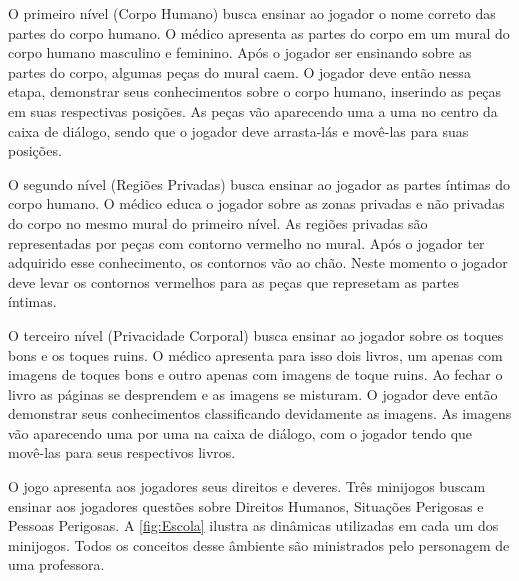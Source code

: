 \begin{figure}
  \vspace{-1.0cm}
\end{figure}

O primeiro nível (Corpo Humano) busca ensinar ao jogador o nome correto das partes do corpo humano. O médico apresenta as partes do corpo em um mural do corpo humano masculino e feminino. Após o jogador ser ensinando sobre as partes do corpo, algumas peças do mural caem. O jogador deve então nessa etapa, demonstrar seus conhecimentos sobre o corpo humano, inserindo as peças em suas respectivas posições. As peças vão aparecendo uma a uma no centro da caixa de diálogo, sendo que o jogador deve arrasta-lás e movê-las para suas posições. %


O segundo nível (Regiões Privadas) busca ensinar ao jogador as partes íntimas do corpo humano. O médico educa o jogador sobre as zonas privadas e não privadas do corpo no mesmo mural do primeiro nível. As regiões privadas são representadas por peças com contorno vermelho no mural. Após o jogador ter adquirido esse conhecimento, os contornos vão ao chão. Neste momento o jogador deve levar os contornos vermelhos para as peças que represetam as partes íntimas.

O terceiro nível (Privacidade Corporal) busca ensinar ao jogador sobre os toques bons e os toques ruins. O médico apresenta para isso dois livros, um apenas com imagens de toques bons e outro apenas com imagens de toque ruins. Ao fechar o livro as páginas se desprendem e as imagens se misturam. O jogador deve então demonstrar seus conhecimentos classificando devidamente as imagens. As imagens vão aparecendo uma por uma na caixa de diálogo, com o jogador tendo que movê-las para seus respectivos livros. 

O jogo apresenta aos jogadores seus direitos e deveres. Três minijogos buscam ensinar aos jogadores questões sobre Direitos Humanos, Situações Perigosas e Pessoas Perigosas. A \autoref{fig:Escola} ilustra as dinâmicas utilizadas em cada um dos minijogos. Todos os conceitos desse âmbiente são ministrados pelo personagem de uma professora. 

